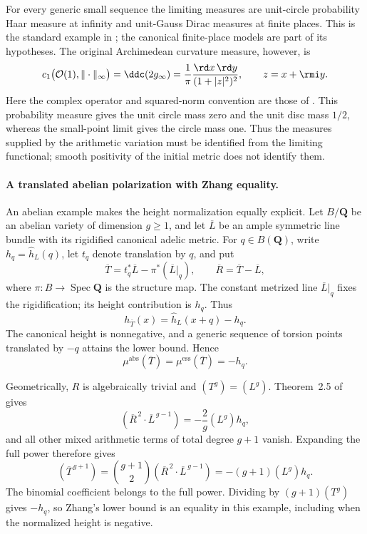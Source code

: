 For every generic small sequence the limiting measures are
unit-circle probability Haar measure at infinity and unit-Gauss
Dirac measures at finite places. This is the standard example in
\cite[Theorem~6.4 and Example~6.5]{BGPRS19Published}; the canonical
finite-place models are part of its hypotheses.
The original Archimedean curvature measure, however, is
\[
 c_1\bigl(\mathcal O(1),\|\cdot\|_\infty\bigr)
   =\ddc(2g_\infty)
   =\frac{1}{\pi}\frac{\rd x\,\rd y}{(1+|z|^2)^2},
                  \qquad z=x+\rmi y.
\]
Here the complex operator and squared-norm convention are those
of .
This probability measure gives the unit circle mass zero and
the unit disc mass $1/2$, whereas the small-point limit gives
the circle mass one. Thus the measures supplied by the arithmetic
variation must be identified from the limiting functional;
smooth positivity of the initial metric does not identify them.

\paragraph{A translated abelian polarization with Zhang equality.}
An abelian example makes the height normalization equally explicit.
Let $B/\mathbf Q$ be an abelian variety of dimension $g\geq1$, and
let $\overline L$ be an ample symmetric line bundle with its
rigidified canonical adelic metric. For $q\in B(\mathbf Q)$, write
$h_q=\widehat h_L(q)$, let $t_q$ denote translation by $q$, and put
\[
 \overline T=t_q^*\overline L-
                 \pi^*(\overline L|_q),\qquad
 \overline R=\overline T-\overline L,
\]
where $\pi:B\to\operatorname{Spec}\mathbf Q$ is the structure map.
The constant metrized line $\overline L|_q$ fixes the rigidification;
its height contribution is $h_q$. Thus
\[
 h_{\overline T}(x)=\widehat h_L(x+q)-h_q.
\]
The canonical height is nonnegative, and a generic sequence of
torsion points translated by $-q$ attains the lower bound. Hence
\[
 \mu^{\mathrm{abs}}(\overline T)
       =\mu^{\mathrm{ess}}(\overline T)=-h_q.
\]

Geometrically, $R$ is algebraically trivial and $(T^g)=(L^g)$.
Theorem~2.5 of \cite{CL00Published} gives
\[
 (\overline R^{\,2}\cdot\overline L^{\,g-1})
       =-\frac2g(L^g)h_q,
\]
and all other mixed arithmetic terms of total degree $g+1$ vanish.
Expanding the full power therefore gives
\[
 (\overline T^{\,g+1})
   =\binom{g+1}{2}
      (\overline R^{\,2}\cdot\overline L^{\,g-1})
   =-(g+1)(L^g)h_q.
\]
The binomial coefficient belongs to the full power. Dividing by
$(g+1)(T^g)$ gives $-h_q$, so Zhang's lower bound is an equality
in this example, including when the normalized height is negative.

